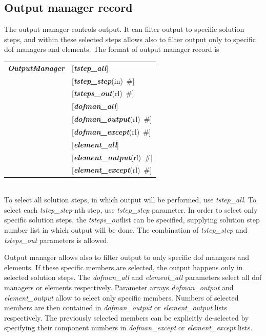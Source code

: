 \documentclass[a4paper]{article}
\makeatletter
\newcommand{\param}[1]{{\em #1}}
\newcommand{\keywordnotype}[1]{\mbox{{\it{\bf{#1}}}}}
\newcommand{\keyword}[2]{\mbox{{\keywordnotype{#1}\tiny (#2)}}}
\newcommand{\field}[2]{\mbox{\keyword{#1}{#2}~\#}}
\newcommand{\optField}[2]{\mbox{[\field{#1}{#2}]}}
\newenvironment{record}[1][]{\begin{tabular}{|ll}}{\end{tabular}\\}
\newcommand{\recentry}[2]{{#1}&{#2}\\}
\newcounter{rcc}
\newenvironment{record}[1][\textwidth]{\setcounter{rcc}{0}\begin{tabular*}{#1}{|ll@{\extracolsep{\fill}}r}}{\end{tabular*}\\}
\newcommand{\recentry}[2]{\ifthenelse{\value{rcc}>0}{&$\backslash$ \\}{\setcounter{rcc}{1}}{#1}&{#2}}
\makeatother
\begin{document}
\subsection{Output manager record}
\label{_OutputManagerRecord}
The output manager controls output. It can filter output to specific
solution steps, and within these selected steps allows also to filter
output only to specific dof managers and elements. The format of
output manager record is \\
\begin{record}
  \recentry{\keywordnotype{OutputManager}}{[\keywordnotype{tstep\_all}]}
  \recentry{}{\optField{tstep\_step}{in}} \recentry{}{\optField{tsteps\_out}{rl}}
  \recentry{}{[\keywordnotype{dofman\_all}]} \recentry{}{\optField{dofman\_output}{rl}}
  \recentry{}{\optField{dofman\_except}{rl}}
  \recentry{}{[\keywordnotype{element\_all}]} \recentry{}{\optField{element\_output}{rl}}
  \recentry{}{\optField{element\_except}{rl}}
\end{record}
To select all solution steps, in which output will be performed, use
\param{tstep\_all}. To select each \param{tstep\_step}-nth step, use
\param{tstep\_step} parameter. In order to select only specific
solution steps, the \param{tsteps\_out}list can be specified,
supplying solution step number list in which output will be done.
The combination of \param{tstep\_step} and
\param{tsteps\_out} parameters is allowed. 

Output manager allows also to filter output to only specific dof
managers and elements. If these specific members are selected, the
output happens only in selected solution steps. 
The \param{dofman\_all} and \param{element\_all} parameters select
all dof managers or elements respectively. Parameter arrays
\param{dofman\_output} and \param{element\_output} allow to select
only specific members. Numbers of selected members are then contained
in \param{dofman\_output} or \param{element\_output} lists
respectively. The previously selected members can be explicitly
de-selected by specifying their component numbers in \param{dofman\_except} or
\param{element\_except} lists.
\end{document}

